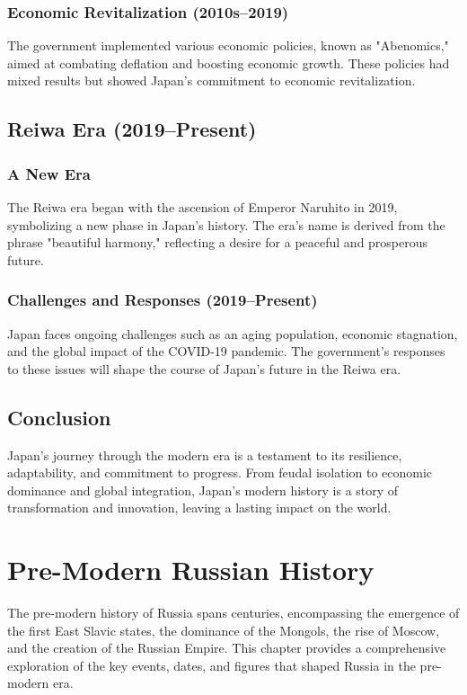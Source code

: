 \documentclass{book}
\begin{document}
\subsection{Economic Revitalization (2010s–2019)}
The government implemented various economic policies, known as "Abenomics," aimed at combating deflation and boosting economic growth. These policies had mixed results but showed Japan’s commitment to economic revitalization.

\section{Reiwa Era (2019–Present)}
\label{sec:reiwa-era}
\subsection{A New Era}
The Reiwa era began with the ascension of Emperor Naruhito in 2019, symbolizing a new phase in Japan’s history. The era's name is derived from the phrase "beautiful harmony," reflecting a desire for a peaceful and prosperous future.

\subsection{Challenges and Responses (2019–Present)}
Japan faces ongoing challenges such as an aging population, economic stagnation, and the global impact of the COVID-19 pandemic. The government’s responses to these issues will shape the course of Japan’s future in the Reiwa era.

\section{Conclusion}
\label{sec:conclusion-modern-japan}
Japan’s journey through the modern era is a testament to its resilience, adaptability, and commitment to progress. From feudal isolation to economic dominance and global integration, Japan’s modern history is a story of transformation and innovation, leaving a lasting impact on the world.

\chapter{Pre-Modern Russian History}
\label{ch:pre-modern-russian-history}

The pre-modern history of Russia spans centuries, encompassing the emergence of the first East Slavic states, the dominance of the Mongols, the rise of Moscow, and the creation of the Russian Empire. This chapter provides a comprehensive exploration of the key events, dates, and figures that shaped Russia in the pre-modern era.
\end{document}
